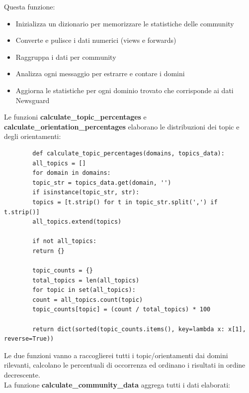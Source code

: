 \documentclass[12pt]{article}
\begin{document}
	Questa funzione:
	\begin{itemize}[label=]
		\item Inizializza un dizionario per memorizzare le statistiche delle community
		\item Converte e pulisce i dati numerici (views e forwards)
		\item Raggruppa i dati per community
		\item Analizza ogni messaggio per estrarre e contare i domini
		\item Aggiorna le statistiche per ogni dominio trovato che corrisponde ai dati Newsguard
	\end{itemize}
	Le funzioni \textbf{calculate\_topic\_percentages} e \textbf{calculate\_orientation\_percentages} elaborano le distribuzioni dei topic e degli orientamenti:
	\begin{lstlisting}
		def calculate_topic_percentages(domains, topics_data):
		all_topics = []
		for domain in domains:
		topic_str = topics_data.get(domain, '')
		if isinstance(topic_str, str):
		topics = [t.strip() for t in topic_str.split(',') if t.strip()]
		all_topics.extend(topics)
		
		if not all_topics:
		return {}
		
		topic_counts = {}
		total_topics = len(all_topics)
		for topic in set(all_topics):
		count = all_topics.count(topic)
		topic_counts[topic] = (count / total_topics) * 100
		
		return dict(sorted(topic_counts.items(), key=lambda x: x[1], reverse=True))
	\end{lstlisting}
	Le due funzioni vanno a raccoglierei tutti i topic/orientamenti dai domini rilevanti, calcolano le percentuali di occorrenza ed ordinano i risultati in ordine decrescente.\\
	La funzione \textbf{calculate\_community\_data} aggrega tutti i dati elaborati:
\end{document}

